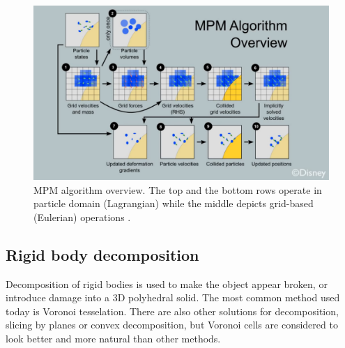 \begin{figure}
\centering
\includegraphics[width=\textwidth]{img/MPM}
\caption{MPM algorithm overview. The top and the bottom rows operate in particle domain (Lagrangian) while the middle depicts grid-based (Eulerian) operations \cite{disney}.
}
\label{fig:mpm}
\end{figure}

\subsection{Rigid body decomposition}

Decomposition of rigid bodies is used to make the object appear broken, or introduce damage into a 3D polyhedral solid. The most common method used today is Voronoi tesselation.
There are also other solutions for decomposition, \eg slicing by planes or convex decomposition, but Voronoi cells are considered to look better and more natural than other methods. 

